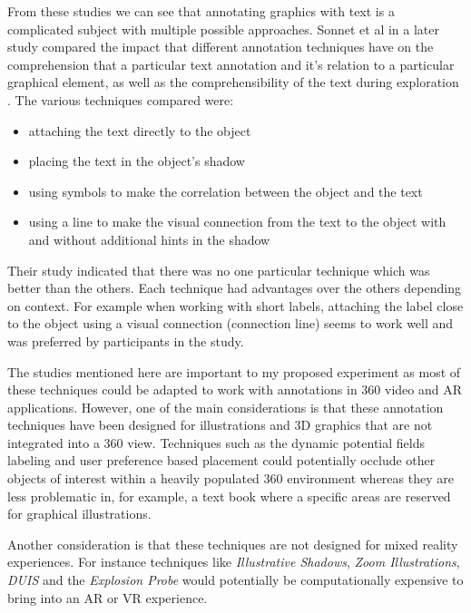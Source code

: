 \documentclass{article}
\begin{document}
From these studies we can see that annotating graphics with text is a complicated subject with multiple possible approaches. Sonnet et al in a later study compared the impact that different annotation techniques have on the comprehension that a particular text annotation and it's relation to a particular graphical element, as well as the comprehensibility of  the text during exploration \cite{Sonnet2005}. The various techniques compared were:
\begin{itemize}
\item attaching the text directly to the object
\item placing the text in the object’s shadow
\item using symbols to make the correlation between the object and the text
\item using a line to make the visual connection from the text to the object with and without additional hints in the shadow
\end{itemize}
Their study indicated that there was no one particular technique which was better than the others. Each technique had advantages over the others depending on context. For example when working with short labels, attaching the label close to the object using a visual connection (connection line) seems to work well and was preferred by participants in the study.

The studies mentioned here are important to my proposed experiment as most of these techniques could be adapted to work with annotations in 360 video and AR applications. However, one of the main considerations is that these annotation techniques have been designed for illustrations and 3D graphics that are not integrated into a 360 view. Techniques such as the dynamic potential fields labeling \cite{Hartmann2004} and user preference based placement \cite{Hartmann2005b} could potentially occlude other objects of interest within a heavily populated 360 environment whereas they are less problematic in, for example, a text book where a specific areas are reserved for graphical illustrations. 

Another consideration is that these techniques are not designed for mixed reality experiences. For instance techniques like \textit{Illustrative Shadows}\cite{Ritter:2003:ISI:604045.604072}, \textit{Zoom Illustrations}\cite{preim1997coherent}, \textit{DUIS}\cite{Chigona:2002:CTE:569005.569010} and the \textit{Explosion Probe}\cite{Sonnet:2004:IEA:989863.989871} would potentially be computationally expensive to bring into an AR or VR experience.  
\end{document}
